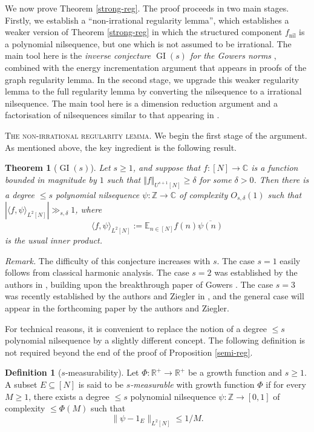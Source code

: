 \documentclass[11pt,reqno]{amsart}
\numberwithin{equation}{section}
\theoremstyle{plain}
\newtheorem{theorem}[subsection]{Theorem}
\theoremstyle{definition}
\newtheorem{definition}[subsection]{Definition}
\renewcommand{\leq}{\leqslant}
\renewcommand{\geq}{\geqslant}
\newcommand\E{{\mathbb{E}}}
\newcommand\Z{\mathbb{Z}}
\newcommand\R{\mathbb{R}}
\newcommand\C{\mathbb{C}}
\newcommand\1{{\bf 1}}
\newcommand\2{{\bf 2}}
\newcommand\GI{\operatorname{GI}}
\newcommand\nil{{\operatorname{nil}}}
\begin{document}
We now prove Theorem \ref{strong-reg}.  The proof proceeds in two main stages.  Firstly, we establish a ``non-irrational regularity lemma'', which establishes a weaker version of Theorem \ref{strong-reg} in which the structured component $f_\nil$ is a polynomial nilsequence, but one which is not assumed to be irrational.  The main tool here is the \emph{inverse conjecture $\GI(s)$ for the Gowers norms} \cite{gtz-announcement}, combined with the energy incrementation argument that appears in proofs of the graph regularity lemma.  In the second stage, we upgrade this weaker regularity lemma to the full regularity lemma by converting the nilsequence to a irrational nilsequence.  The main tool here is a dimension reduction argument and a factorisation of nilsequences similar to that appearing in \cite{green-tao-nilratner}.

\textsc{The non-irrational regularity lemma.} We begin the first stage of the argument.  As mentioned above, the key ingredient is the following result.  

\begin{theorem}[$\GI(s)$]\label{gis-conj}
Let $s \geq 1$, and suppose that $f : [N] \rightarrow \C$ is a function bounded in magnitude by $1$ such that $\Vert f \Vert_{U^{s+1}[N]} \geq \delta$ for some $\delta>0$. Then there is a degree $\leq s$ polynomial nilsequence $\psi: \Z \to \C$ of complexity $O_{s,\delta}(1)$ such that $|\langle f, \psi \rangle_{L^2[N]}| \gg_{s,\delta} 1$, where 
$$ \langle f, \psi\rangle_{L^2[N]} := \E_{n \in [N]} f(n) \overline{\psi(n)}$$
is the usual inner product.
\end{theorem}

\emph{Remark.} The difficulty of this conjecture increases with $s$.  The case $s=1$ easily follows from classical harmonic analysis.  The case $s=2$ was established by the authors in \cite{green-tao-u3inverse}, building upon the breakthrough paper of Gowers \cite{gowers-4aps}.  The case $s=3$ was recently established by the authors and Ziegler in \cite{green-tao-ziegler-u4inverse}, and the general case will appear in the forthcoming paper \cite{gtz-announcement} by the authors and Ziegler.

For technical reasons, it is convenient to replace the notion of a degree $\leq s$ polynomial nilsequence by a slightly different concept.  The following definition is not required beyond the end of the proof of Proposition \ref{semi-reg}.

\begin{definition}[$s$-measurability]\label{s-meas-def}  Let $\Phi: \R^+ \to \R^+$ be a growth function and $s \geq 1$.  A subset $E \subseteq [N]$ is said to be \emph{$s$-measurable} with growth function $\Phi$ if for every $M \geq 1$, there exists a degree $\leq s$ polynomial nilsequence $\psi: \Z \to [0,1]$ of complexity $\leq \Phi(M)$ such that
$$ \| \psi - 1_E \|_{L^2[N]} \leq 1/M.$$
\end{definition}
\end{document}
